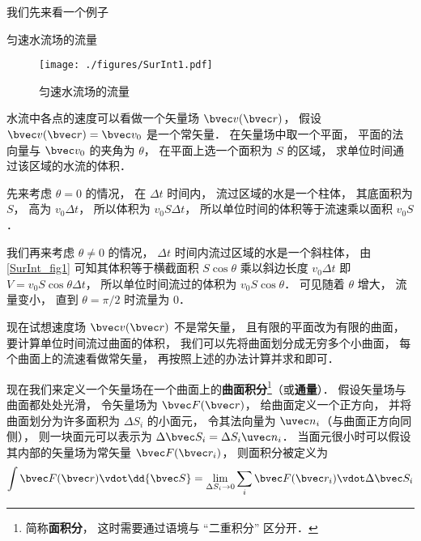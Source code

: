 

我们先来看一个例子

\begin{example}{匀速水流场的流量}\label{SurInt_ex1}

\begin{figure}[ht]
\centering
\texttt{[image: ./figures/SurInt1.pdf]}
\caption{匀速水流场的流量} \label{SurInt_fig1}
\end{figure}

水流中各点的速度可以看做一个矢量场 $\bvec v(\bvec r)$， 假设 $\bvec v(\bvec r) = \bvec v_0$ 是一个常矢量． 在矢量场中取一个平面， 平面的法向量与 $\bvec v_0$ 的夹角为 $\theta$， 在平面上选一个面积为 $S$ 的区域， 求单位时间通过该区域的水流的体积．

先来考虑 $\theta = 0$ 的情况， 在 $\Delta t$ 时间内， 流过区域的水是一个柱体， 其底面积为 $S$， 高为 $v_0\Delta t$， 所以体积为 $v_0 S\Delta t$， 所以单位时间的体积等于流速乘以面积 $v_0 S$．

我们再来考虑 $\theta \ne 0$ 的情况， $\Delta t$ 时间内流过区域的水是一个斜柱体， 由\autoref{SurInt_fig1} 可知其体积等于横截面积 $S\cos\theta$ 乘以斜边长度 $v_0\Delta t$ 即 $V = v_0 S\cos\theta\Delta t$， 所以单位时间流过的体积为 $v_0 S\cos\theta$． 可见随着 $\theta$ 增大， 流量变小， 直到 $\theta = \pi/2$ 时流量为 $0$．

现在试想速度场 $\bvec v(\bvec r)$ 不是常矢量， 且有限的平面改为有限的曲面， 要计算单位时间流过曲面的体积， 我们可以先将曲面划分成无穷多个小曲面， 每个曲面上的流速看做常矢量， 再按照上述的办法计算并求和即可．
\end{example}

现在我们来定义一个矢量场在一个曲面上的\textbf{曲面积分}\footnote{简称\textbf{面积分}， 这时需要通过语境与 “二重积分” 区分开．}（或\textbf{通量}）． 假设矢量场与曲面都处处光滑， 令矢量场为 $\bvec F(\bvec r)$， 给曲面定义一个正方向， 并将曲面划分为许多面积为 $\Delta S_i$ 的小面元， 令其法向量为 $\uvec n_i$（与曲面正方向同侧）， 则一块面元可以表示为 $\Delta \bvec S_i = \Delta S_i \uvec n_i$． 当面元很小时可以假设其内部的矢量场为常矢量 $\bvec F(\bvec r_i)$， 则面积分被定义为
\begin{equation}\label{SurInt_eq1}
\int \bvec F(\bvec r) \vdot \dd{\bvec S} = \lim_{\Delta S_i\to 0} \sum_i \bvec F(\bvec r_i) \vdot \Delta \bvec S_i
\end{equation}

